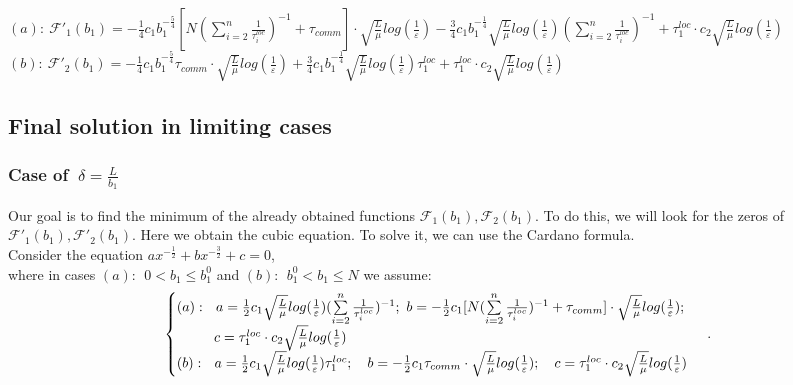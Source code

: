 \documentclass{article}
\begin{document}
$(a): ~\mathcal{F'}_1(b_1) = -\frac{1}{4}c_1 b_1^{-\frac{5}{4}}  [N (\sum\limits_{i = 2}^{n} \frac{1}{\tau_i^{loc}})^{-1} + \tau_{comm}]\cdot 
\sqrt{\frac{L}{\mu}}log (\frac{1}{\varepsilon})  - 
\frac{3}{4} c_1 b_1^{-\frac{1}{4}}   \sqrt{\frac{L}{\mu}}log (\frac{1}{\varepsilon})(\sum\limits_{i = 2}^{n} \frac{1}{\tau_i^{loc}})^{-1} +
\tau_1^{loc}\cdot c_2  \sqrt{\frac{L}{\mu}}log (\frac{1}{\varepsilon})$ \\
$(b): ~\mathcal{F'}_2(b_1) = -\frac{1}{4}c_1 b_1^{-\frac{5}{4}} \tau_{comm}\cdot \sqrt{\frac{L}{\mu}}log (\frac{1}{\varepsilon}) + \frac{3}{4} c_1 b_1^{-\frac{1}{4}}  \sqrt{\frac{L}{\mu}}log (\frac{1}{\varepsilon})\tau_1^{loc}   + \tau_1^{loc}\cdot c_2  \sqrt{\frac{L}{\mu}}log (\frac{1}{\varepsilon})$\\

\subsection{Final solution in limiting cases}
\subsubsection{Case of $~\delta = \frac{L}{b_1}$}\label{eq:3.4.1}
Our goal is to find the minimum of the already obtained functions $\mathcal{F}_1(b_1), \mathcal{F}_2(b_1)$. To do this, we will look for the zeros of $\mathcal{F'}_1(b_1), \mathcal{F'}_2(b_1)$. Here we obtain the cubic equation.
To solve it, we can use the Cardano formula.\\
Consider the equation $ax^{-\frac{1}{2}} + bx^{-\frac{3}{2}} + c = 0$,\\
where in cases $(a): ~ ~ 0 < b_1 \leq b_1^0 $ and $(b): ~ ~ b_1^0 <  b_1 \leq N$ we assume:
\begin{eqnarray}
\notag
    \begin{cases}
    (a): ~ ~ a = \frac{1}{2} c_1 \sqrt{\frac{L}{\mu}}log (\frac{1}{\varepsilon})(\sum\limits_{i = 2}^{n} \frac{1}{\tau_i^{loc}})^{-1}; ~
b = -\frac{1}{2} c_1 [N (\sum\limits_{i = 2}^{n} \frac{1}{\tau_i^{loc}})^{-1} + \tau_{comm}]\cdot 
\sqrt{\frac{L}{\mu}}log (\frac{1}{\varepsilon});\\
\quad\quad~~ c = \tau_1^{loc}\cdot c_2  \sqrt{\frac{L}{\mu}}log (\frac{1} {\varepsilon})
    \\
\notag
    (b): ~ ~ a = \frac{1}{2} c_1  \sqrt{\frac{L}{\mu}}log (\frac{1}{\varepsilon})\tau_1^{loc}; \quad 
b = -\frac{1}{2}c_1 \tau_{comm}\cdot \sqrt{\frac{L}{\mu}}log (\frac{1}{\varepsilon}); \quad 
c = \tau_1^{loc}\cdot c_2  \sqrt{\frac{L}{\mu}}log (\frac{1} {\varepsilon})
    \end{cases}\,.
\end{eqnarray}
\end{document}
